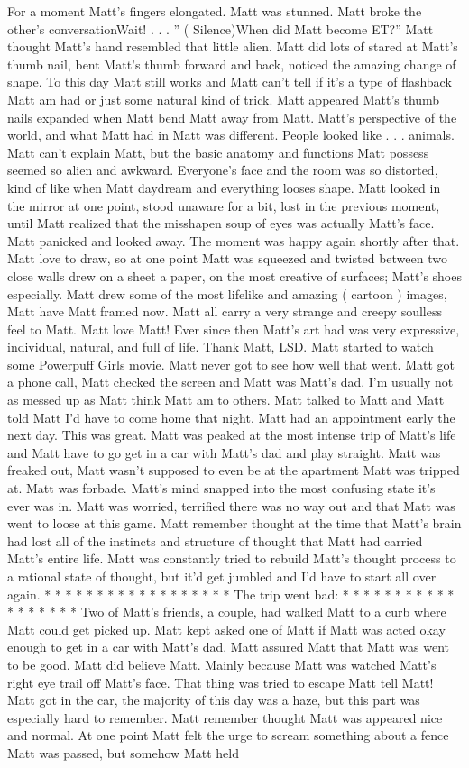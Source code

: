 \documentclass[12pt]{book}
\begin{document}
For a moment Matt's fingers elongated. Matt was stunned. Matt broke the other's conversationWait! . . . '' ( Silence)When did Matt become ET?'' Matt thought Matt's hand resembled that little alien. Matt did lots of stared at Matt's thumb nail, bent Matt's thumb forward and back, noticed the amazing change of shape. To this day Matt still works and Matt can't tell if it's a type of flashback Matt am had or just some natural kind of trick. Matt appeared Matt's thumb nails expanded when Matt bend Matt away from Matt. Matt's perspective of the world, and what Matt had in Matt was different. People looked like . . .  animals. Matt can't explain Matt, but the basic anatomy and functions Matt possess seemed so alien and awkward. Everyone's face and the room was so distorted, kind of like when Matt daydream and everything looses shape. Matt looked in the mirror at one point, stood unaware for a bit, lost in the previous moment, until Matt realized that the misshapen soup of eyes was actually Matt's face. Matt panicked and looked away. The moment was happy again shortly after that. Matt love to draw, so at one point Matt was squeezed and twisted between two close walls drew on a sheet a paper, on the most creative of surfaces; Matt's shoes especially. Matt drew some of the most lifelike and amazing ( cartoon ) images, Matt have Matt framed now. Matt all carry a very strange and creepy soulless feel to Matt. Matt love Matt! Ever since then Matt's art had was very expressive, individual, natural, and full of life. Thank Matt, LSD. Matt started to watch some Powerpuff Girls movie. Matt never got to see how well that went. Matt got a phone call, Matt checked the screen and Matt was Matt's dad. I'm usually not as messed up as Matt think Matt am to others. Matt talked to Matt and Matt told Matt I'd have to come home that night, Matt had an appointment early the next day. This was great. Matt was peaked at the most intense trip of Matt's life and Matt have to go get in a car with Matt's dad and play straight. Matt was freaked out, Matt wasn't supposed to even be at the apartment Matt was tripped at. Matt was forbade. Matt's mind snapped into the most confusing state it's ever was in. Matt was worried, terrified there was no way out and that Matt was went to loose at this game. Matt remember thought at the time that Matt's brain had lost all of the instincts and structure of thought that Matt had carried Matt's entire life. Matt was constantly tried to rebuild Matt's thought process to a rational state of thought, but it'd get jumbled and I'd have to start all over again. * * * * * * * * * * * * * * * * * * The trip went bad: * * * * * * * * * * * * * * * * * * Two of Matt's friends, a couple, had walked Matt to a curb where Matt could get picked up. Matt kept asked one of Matt if Matt was acted okay enough to get in a car with Matt's dad. Matt assured Matt that Matt was went to be good. Matt did believe Matt. Mainly because Matt was watched Matt's right eye trail off Matt's face. That thing was tried to escape Matt tell Matt! Matt got in the car, the majority of this day was a haze, but this part was especially hard to remember. Matt remember thought Matt was appeared nice and normal. At one point Matt felt the urge to scream something about a fence Matt was passed, but somehow Matt held 
\end{document}
